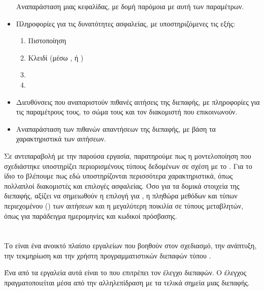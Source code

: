 \begin{itemize}
    Αναπαράσταση μιας κεφαλίδας,
    με δομή παρόμοια με αυτή των παραμέτρων.

    \item \underline{}
    
    Πληροφορίες για τις δυνατότητες ασφαλείας,
    με υποστηριζόμενες τις εξής:
    
    \begin{enumerate}
        \item Πιστοποίηση 
        \item Κλειδί  (μέσω ,  ή )
        \item {}
        \item {}
    \end{enumerate}

    \item \underline{}
    
    Διευθύνσεις που αναπαριστούν πιθανές αιτήσεις της διεπαφής,
    με πληροφορίες για τις παραμέτρους τους,
    το σώμα τους και τον διακομιστή που επικοινωνούν.

    \item \underline{}
    
    Αναπαράσταση των πιθανών απαντήσεων της διεπαφής,
    με βάση τα χαρακτηριστικά των αιτήσεων.
\end{itemize}

Σε αντιπαραβολή με την παρούσα εργασία,
παρατηρούμε πως η μοντελοποίηση  που σχεδιάστηκε
υποστηρίζει περιορισμένους τύπους δεδομένων σε σχέση με το .
Για το ίδιο το  βλέπουμε πως εδώ υποστηρίζονται περισσότερα χαρακτηριστικά,
όπως πολλαπλοί διακομιστές και επιλογές ασφαλείας.
Όσο για τα δομικά στοιχεία της διεπαφής,
αξίζει να σημειωθούν η επιλογή για ,
η πληθώρα μεθόδων και τύπων περιεχομένου () των αιτήσεων
και η μεγαλύτερη ποικιλία σε τύπους μεταβλητών, όπως για παράδειγμα ημερομηνίες και κωδικοί πρόσβασης.

\section{}
Το  είναι ένα ανοικτό πλαίσιο εργαλείων που βοηθούν στον σχεδιασμό,
την ανάπτυξη, την τεκμηρίωση και την χρήστη προγραμματιστικών διεπαφών τύπου . 

Ένα από τα εργαλεία αυτά είναι το  που επιτρέπει τον έλεγχο διεπαφών.
Ο έλεγχος πραγματοποιείται μέσα από την αλληλεπίδραση με τα τελικά σημεία μιας διεπαφής.

